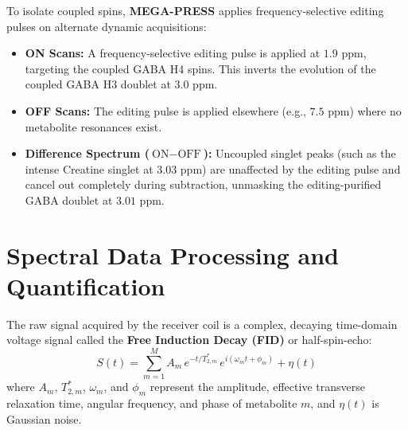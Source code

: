 \documentclass[11pt,a4paper]{article}
\begin{document}
To isolate coupled spins, \textbf{MEGA-PRESS} applies frequency-selective editing pulses on alternate dynamic acquisitions:
\begin{itemize}
    \item \textbf{ON Scans:} A frequency-selective editing pulse is applied at $1.9\text{ ppm}$, targeting the coupled GABA H4 spins. This inverts the evolution of the coupled GABA H3 doublet at $3.0\text{ ppm}$.
    \item \textbf{OFF Scans:} The editing pulse is applied elsewhere (e.g., $7.5\text{ ppm}$) where no metabolite resonances exist.
    \item \textbf{Difference Spectrum ($\text{ON} - \text{OFF}$):} Uncoupled singlet peaks (such as the intense Creatine singlet at $3.03\text{ ppm}$) are unaffected by the editing pulse and cancel out completely during subtraction, unmasking the editing-purified GABA doublet at $3.01\text{ ppm}$.
\end{itemize}

\section{Spectral Data Processing and Quantification}
The raw signal acquired by the receiver coil is a complex, decaying time-domain voltage signal called the \textbf{Free Induction Decay (FID)} or half-spin-echo:
\begin{equation}
    S(t) = \sum_{m=1}^M A_m \, e^{-t/T_{2,m}^*} \, e^{i (\omega_m t + \phi_m)} + \eta(t)
\end{equation}
where $A_m$, $T_{2,m}^*$, $\omega_m$, and $\phi_m$ represent the amplitude, effective transverse relaxation time, angular frequency, and phase of metabolite $m$, and $\eta(t)$ is Gaussian noise.
\end{document}
